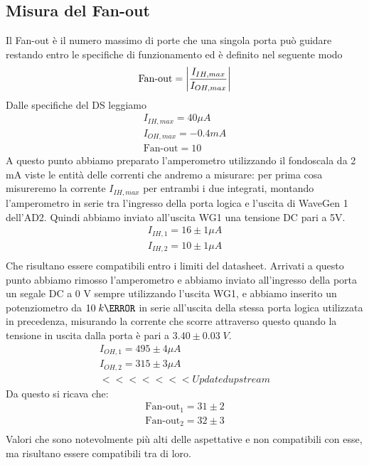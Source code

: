 \documentclass[10pt, a4paper, italian]{article}
\begin{document}
\subsection{Misura del Fan-out}
Il Fan-out è il numero massimo di porte che una singola porta può guidare restando entro le specifiche di funzionamento ed è definito nel seguente modo
\[
\mbox{Fan-out}=\left|   \frac{I_{IH,max}}{I_{OH,max}} \right|
\]
Dalle specifiche del DS leggiamo
\begin{gather*}
    I_{IH,max}=40 \mu A\\
    I_{OH,max}= -0.4 m A\\
    \mbox{Fan-out}=10
\end{gather*}
A questo punto abbiamo preparato l'amperometro utilizzando il fondoscala da 2 mA viste le entità delle correnti che andremo a misurare: per prima cosa misureremo la corrente $I_{IH,max}$ per entrambi i due integrati, montando l'amperometro in serie tra l'ingresso della porta logica e l'uscita di WaveGen 1 dell'AD2. Quindi abbiamo inviato all'uscita WG1 una tensione DC pari a 5V.
\begin{gather*}
    I_{IH,1}=16 \pm 1 \mu A\\
    I_{IH,2}=10 \pm 1 \mu A\\   
\end{gather*}
Che risultano essere compatibili entro i limiti del datasheet.
Arrivati a questo punto abbiamo rimosso l'amperometro e abbiamo inviato all'ingresso della porta un segale DC a 0 V sempre utilizzando l'uscita WG1, e abbiamo inserito un potenziometro da $10 \; k\ohm$ in serie all'uscita della stessa porta logica utilizzata in precedenza, misurando la corrente che scorre attraverso questo quando la tensione in uscita dalla porta è pari a $3.40 \pm 0.03 \; V$.
\begin{gather*}
    I_{OH,1}=495 \pm 4 \mu A\\
    I_{OH,2}=315 \pm 3 \mu A\\   
<<<<<<< Updated upstream
\end{gather*}
Da questo si ricava che:
\begin{gather*}
    \mbox{Fan-out}_1=31 \pm 2\\
    \mbox{Fan-out}_2=32 \pm 3\\
\end{gather*}
Valori che sono notevolmente più alti delle aspettative e non compatibili con esse, ma risultano essere compatibili tra di loro.
\end{document}
